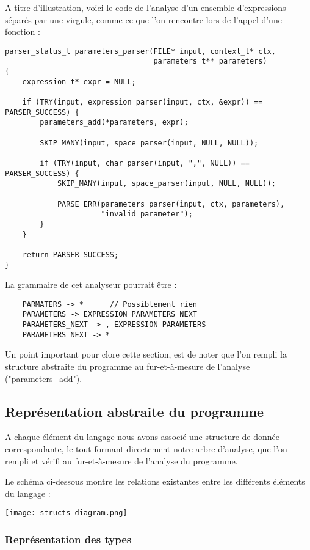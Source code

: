 A titre d'illustration, voici le code de l'analyse d'un ensemble d'expressions
séparés par une virgule, comme ce que l'on rencontre lors de l'appel d'une
fonction :
\begin{verbatim}
parser_status_t parameters_parser(FILE* input, context_t* ctx,
                                  parameters_t** parameters)
{
    expression_t* expr = NULL;

    if (TRY(input, expression_parser(input, ctx, &expr)) == PARSER_SUCCESS) {
        parameters_add(*parameters, expr);

        SKIP_MANY(input, space_parser(input, NULL, NULL));

        if (TRY(input, char_parser(input, ",", NULL)) == PARSER_SUCCESS) {
            SKIP_MANY(input, space_parser(input, NULL, NULL));

            PARSE_ERR(parameters_parser(input, ctx, parameters),
                      "invalid parameter");
        }
    }

    return PARSER_SUCCESS;
}
\end{verbatim}
La grammaire de cet analyseur pourrait être :
\begin{verbatim}
    PARMATERS -> *      // Possiblement rien
    PARAMETERS -> EXPRESSION PARAMETERS_NEXT
    PARAMETERS_NEXT -> , EXPRESSION PARAMETERS
    PARAMETERS_NEXT -> *
\end{verbatim}

Un point important pour clore cette section, est de noter que l'on rempli la
structure abstraite du programme au fur-et-à-mesure de l'analyse
("parameters\_add").

\subsection{Représentation abstraite du programme}

A chaque élément du langage nous avons associé une structure de donnée
correspondante, le tout formant directement notre arbre d'analyse, que l'on
rempli et vérifi au fur-et-à-mesure de l'analyse du programme.

Le schéma ci-dessous montre les relations existantes entre les différents
éléments du langage :

\begin{center}
\texttt{[image: structs-diagram.png]}
\end{center}

\subsubsection{Représentation des types}

